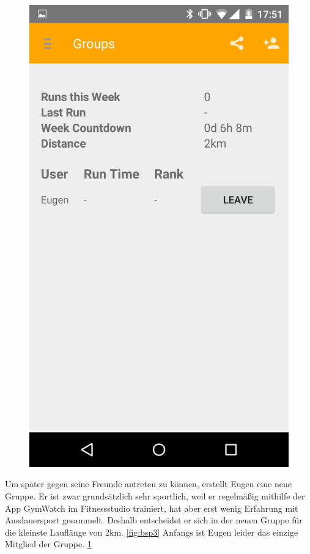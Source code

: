 \begin{figure}[!h]
\begin{minipage}{.4\textwidth}
  \includegraphics[width=.8\linewidth]{abb/bsp/bsp4}
  \label{fig:bsp4}
\end{minipage}
\end{figure}

Um später gegen seine Freunde antreten zu können, erstellt Eugen eine neue Gruppe. Er ist zwar grundsätzlich sehr sportlich, weil er regelmäßig mithilfe der App GymWatch im Fitnessstudio trainiert, hat aber erst wenig Erfahrung mit Ausdauersport gesammelt. Deshalb entscheidet er sich in der neuen Gruppe für die kleinste Lauflänge von 2km. \ref{fig:bsp3} Anfangs ist Eugen leider das einzige Mitglied der Gruppe. \ref{fig:bsp4} 

